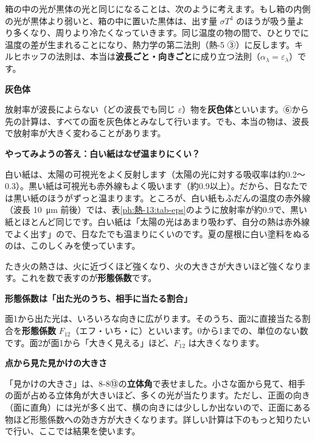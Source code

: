 \begin{seikaku}
箱の中の光が黒体の光と同じになることは、次のように考えます。もし箱の内側の光が黒体より弱いと、箱の中に置いた黒体は、出す量 $\sigma T^4$ のほうが吸う量より多くなり、周りより冷たくなっていきます。同じ温度の物の間で、ひとりでに温度の差が生まれることになり、熱力学の第二法則（熱-5 ③）に反します。キルヒホッフの法則は、本当は\textbf{波長ごと・向きごと}に成り立つ法則（$\alpha_\lambda=\varepsilon_\lambda$）です。
\end{seikaku}

\noindent\textbf{灰色体}\par\nobreak
放射率が波長によらない（どの波長でも同じ $\varepsilon$）物を\textbf{灰色体}といいます。⑥から先の計算は、すべての面を灰色体とみなして行います。でも、本当の物は、波長で放射率が大きく変わることがあります。

\noindent\textbf{やってみようの答え：白い紙はなぜ温まりにくい？}\par\nobreak
白い紙は、太陽の可視光をよく反射します（太陽の光に対する吸収率は約0.2〜0.3）。黒い紙は可視光も赤外線もよく吸います（約0.9以上）。だから、日なたでは黒い紙のほうがずっと温まります。ところが、白い紙もふだんの温度の赤外線（波長 \qty{10}{\micro m} 前後）では、表\ref{ph:熱-13:tab-eps}のように放射率が約0.9で、黒い紙とほとんど同じです。白い紙は「太陽の光はあまり吸わず、自分の熱は赤外線でよく出す」ので、日なたでも温まりにくいのです。夏の屋根に白い塗料をぬるのは、このしくみを使っています。


\leavevmode\label{ph:熱-13:sec5}たき火の熱さは、火に近づくほど強くなり、火の大きさが大きいほど強くなります。これを数で表すのが\textbf{形態係数}です。

\noindent\textbf{形態係数は「出た光のうち、相手に当たる割合」}\par\nobreak
面1から出た光は、いろいろな向きに広がります。そのうち、面2に直接当たる割合を\textbf{形態係数} $F_{12}$（エフ・いち・に）といいます。0から1までの、単位のない数です。面2が面1から「大きく見える」ほど、$F_{12}$ は大きくなります。

\noindent\textbf{点から見た見かけの大きさ}\par\nobreak
「見かけの大きさ」は、8-8⑬の\textbf{立体角}で表せました。小さな面から見て、相手の面が占める立体角が大きいほど、多くの光が当たります。ただし、正面の向き（面に直角）には光が多く出て、横の向きには少ししか出ないので、正面にある物ほど形態係数への効き方が大きくなります。詳しい計算は下のもっと知りたいで行い、ここでは結果を使います。

